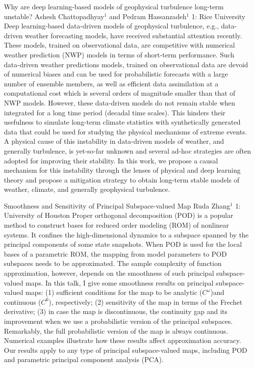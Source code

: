 \begin{addmargin}[2em]{0em}
\vspace{1.5ex}
\abs
{Why are deep learning-based models of geophysical turbulence long-term unstable?}
{Ashesh Chattopadhyay$^1$ and Pedram Hassanzadeh$^1$}
{1: Rice University}
{Deep learning-based data-driven models of geophysical turbulence, e.g., data-driven weather forecasting models, have received substantial attention recently. These models, trained on observational data,  are competitive with numerical weather prediction (NWP) models in terms of short-term performance. Such data-driven weather predictions models, trained on observational data are devoid of numerical biases and can be used for probabilistic forecasts with a large number of ensemble members, as well as efficient data assimilation at a computational cost which is several orders of magnitude smaller than that of NWP models. However, these data-driven models do not remain stable when integrated for a long time period (decadal time scales). This hinders their usefulness to simulate long-term climate statistics with synthetically generated data that could be used for studying the physical mechanisms of extreme events. A physical cause of this instability in data-driven models of weather, and generally turbulence, is yet-so-far unknown and several ad-hoc strategies are often adopted for improving their stability. In this work, we propose a causal mechanism for this instability through the lenses of physical and deep learning theory and propose a mitigation strategy to obtain long-term stable models of weather, climate, and generally geophysical turbulence.}


\vspace{1.5ex}
\abs
{Smoothness and Sensitivity of Principal Subspace-valued Map}
{Ruda Zhang$^{1}$}
{1: University of Houston}
{Proper orthogonal decomposition (POD) is a popular method to construct bases for reduced order modeling (ROM) of nonlinear systems. It confines the high-dimensional dynamics to a subspace spanned by the principal components of some state snapshots. When POD is used for the local bases of a parametric ROM, the mapping from model parameters to POD subspaces needs to be approximated. The sample complexity of function approximation, however, depends on the smoothness of such principal subspace-valued maps. In this talk, I give some smoothness results on principal subspace-valued maps: (1) sufficient conditions for the map to be analytic ($C^\omega$)and continuous ($C^0$), respectively; (2) sensitivity of the map in terms of the Frechet derivative; (3) in case the map is discontinuous, the continuity gap and its improvement when we use a probabilistic version of the principal subspaces. Remarkably, the full probabilistic version of the map is always continuous. Numerical examples illustrate how these results affect approximation accuracy. Our results apply to any type of principal subspace-valued maps, including POD and parametric principal component analysis (PCA).}



\end{addmargin}
